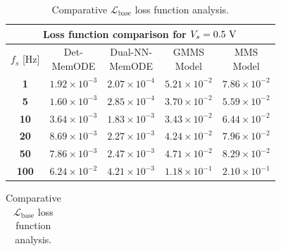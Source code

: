 \documentclass[lettersize,journal]{IEEEtran}
\begin{document}
\begin{table}
  \caption{Comparative \(\mathcal{L}_{\mathrm{base}}\) loss function analysis.}
  \label{tab:mms_comp}
  \centering
  \begin{tabular}{c|cccc}
    \toprule
    \multicolumn{5}{c}{\textbf{Loss function comparison for \(V_s = 0.5 \rm \ V\)}}                                                                                            \\
    \midrule
    \(f_s\) [Hz] & \makecell{Det-                                                                                                                                              \\MemODE}             & \makecell{Dual-NN-                                                                                                             \\ MemODE}                 & \makecell{GMMS\\Model}             & \makecell{MMS\\Model}                                        \\
    \midrule
    \textbf{1}   & \(1.92 \times 10^{-3}\) & \color{ieeegreen} \bfseries \(2.07 \times 10^{-4}\) & \(5.21 \times 10^{-2}\) & \color{ieeered} \bfseries \(7.86 \times 10^{-2}\) \\
    \textbf{5}   & \(1.60 \times 10^{-3}\) & \color{ieeegreen} \bfseries \(2.85 \times 10^{-4}\) & \(3.70 \times 10^{-2}\) & \color{ieeered} \bfseries \(5.59 \times 10^{-2}\) \\
    \textbf{10}  & \(3.64 \times 10^{-3}\) & \color{ieeegreen} \bfseries \(1.83 \times 10^{-3}\) & \(3.43 \times 10^{-2}\) & \color{ieeered} \bfseries \(6.44 \times 10^{-2}\) \\
    \textbf{20}  & \(8.69 \times 10^{-3}\) & \color{ieeegreen} \bfseries \(2.27 \times 10^{-3}\) & \(4.24 \times 10^{-2}\) & \color{ieeered} \bfseries \(7.96 \times 10^{-2}\) \\
    \textbf{50}  & \(7.86 \times 10^{-3}\) & \color{ieeegreen} \bfseries \(2.47 \times 10^{-3}\) & \(4.71 \times 10^{-2}\) & \color{ieeered} \bfseries \(8.29 \times 10^{-2}\) \\
    \textbf{100} & \(6.24 \times 10^{-2}\) & \color{ieeegreen} \bfseries \(4.21 \times 10^{-3}\) & \(1.18 \times 10^{-1}\) & \color{ieeered} \bfseries \(2.10 \times 10^{-1}\) \\
    \bottomrule
  \end{tabular}
  \begin{tabular}{c|cccc}
    \toprule

\end{tabular}
\end{table}
\end{document}
